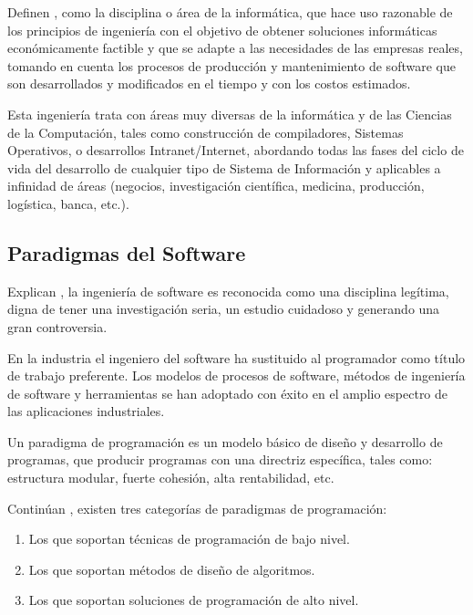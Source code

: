 \documentclass[12pt]{article}
\begin{document}
	Definen \textcite{maida_metodologias_2015}, como la disciplina o área de la informática, que hace uso razonable de los principios de ingeniería con el objetivo de obtener soluciones informáticas económicamente factible y que se adapte a las necesidades de las empresas reales, tomando en cuenta los procesos de producción y mantenimiento de software que son desarrollados y modificados en el tiempo y con los costos estimados.

	Esta ingeniería trata con áreas muy diversas de la informática y de las Ciencias de la Computación, tales como construcción de compiladores, Sistemas Operativos, o desarrollos Intranet/Internet, abordando todas las fases del ciclo de vida del desarrollo de cualquier tipo de Sistema de Información y aplicables a infinidad de áreas (negocios, investigación científica, medicina, producción, logística, banca, etc.).

	\subsection{Paradigmas del Software}

	Explican \textcite{maida_metodologias_2015}, la ingeniería de software es reconocida como una disciplina legítima, digna de tener una investigación seria, un estudio cuidadoso y generando una gran controversia.

	En la industria el ingeniero del software ha sustituido al programador como título de trabajo preferente. Los modelos de procesos de software, métodos de ingeniería de software y herramientas se han adoptado con éxito en el amplio espectro de las aplicaciones industriales.

	Un paradigma de programación es un modelo básico de diseño y desarrollo de programas, que producir programas con una directriz específica, tales como: estructura modular, fuerte cohesión, alta rentabilidad, etc.

	Continúan \textcite{maida_metodologias_2015}, existen tres categorías de paradigmas de programación:

	\begin{enumerate}[left=1.27cm]
		\item Los que soportan técnicas de programación de bajo nivel.
		\item Los que soportan métodos de diseño de algoritmos.
		\item Los que soportan soluciones de programación de alto nivel.
	\end{enumerate}
\end{document}
